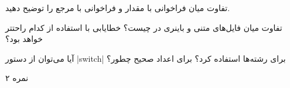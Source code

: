 
تفاوت میان فراخوانی با مقدار و فراخوانی با مرجع را توضیح دهید.

تفاوت میان فایل‌های متنی و باینری در چیست؟ خطایابی با استفاده از کدام راحتتر خواهد بود؟

آیا می‌توان از دستور |switch‌| برای رشته‌ها استفاده کرد؟ برای اعداد صحیح چطور؟

۲ نمره
